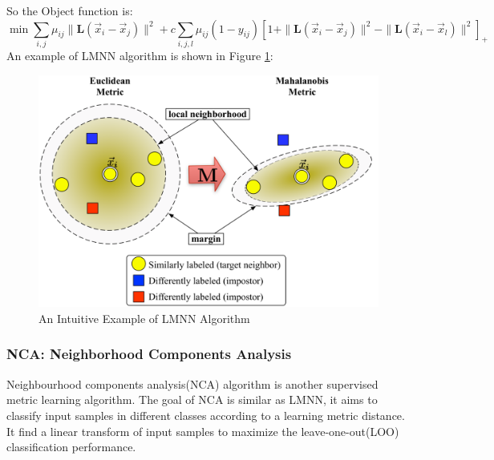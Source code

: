     So the Object function is:
    $$
        \min \sum_{i, j} \mu_{ij} \| \mathbf{L}(\vec{x}_i - \vec{x}_j) \|^2 + c \sum_{i,j,l} \mu_{ij}(1 - y_{ij})\left [ 1 + \| \mathbf{L}(\vec{x}_i - \vec{x}_j) \|^2 - \| \mathbf{L}(\vec{x}_i - \vec{x}_l) \|^2 \right]_{+}
    $$
    An example of LMNN algorithm is shown in Figure \ref{fig:lmnn}:
    \begin{figure}[htbp]
        \centering
        \includegraphics[width=0.6\linewidth]{img/Lmnn-principle.png}
        \caption{An Intuitive Example of LMNN Algorithm}
        \label{fig:lmnn}
    \end{figure}
    

        
\subsubsection{NCA: Neighborhood Components Analysis}


        Neighbourhood components analysis(NCA)\cite{NCA} algorithm is another supervised metric learning algorithm. The goal of NCA is similar as LMNN, it aims to classify input samples in different classes according to a learning metric distance. It find a linear transform of input samples to maximize the leave-one-out(LOO) classification performance.
        
